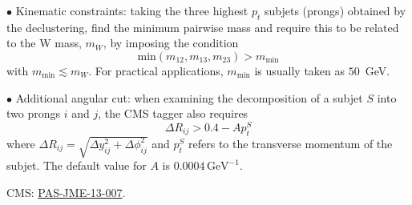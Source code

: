 \documentclass[9pt,a4paper,unknownkeysallowed,xcolor=dvipsnames,aspectratio=43]{beamer}
\begin{document}
\begin{frame}\vspace{2mm}

{\color{darkred}\Large$\bullet$} {\color{darkred} Kinematic constraints}: taking the three highest $p_t$
  subjets (\ie prongs) obtained by the declustering, find the minimum
  pairwise mass and require this to be related to the W mass, $m_W$,
  by imposing the condition
  $$\mathrm{min} \left(m_{12},m_{13},m_{23} \right) > m_{\mathrm{min}}
  $$ 
  with $m_{\mathrm{min}} \lesssim m_W$.
  For practical applications, $m_{\text{min}}$ is usually taken as
  $50$~GeV.\\
  \vspace{8mm}
  
{\color{darkred}\Large$\bullet$ Additional angular cut:} when examining the decomposition of a subjet $S$
  into two prongs $i$ and $j$, the CMS tagger also requires
  $$\Delta R_{ij} > 0.4 - A p_t^S$$
  where
  $\Delta R_{ij} = \sqrt{\Delta y_{ij}^2+ \Delta \phi_{ij}^2}$ and
  $p_t^S$ refers to the transverse momentum of the
  subjet.
  The default value for $A$ is $0.0004 \, \mathrm{GeV^{-1}}$.
  \\\vspace{2mm}
  \begin{center}
      {\tiny \color{teablue}CMS: \href{https://inspirehep.net/files/a6e50d4d502ebd33304460d7111733e0}{PAS-JME-13-007}.}
  \end{center}
\end{frame}
%
%
\end{document}
